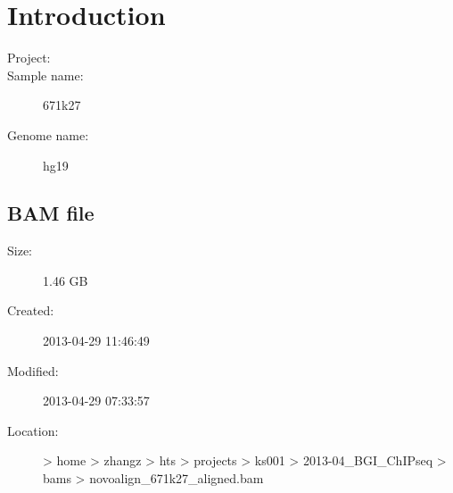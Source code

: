 \documentclass{article}
\begin{document}
\newpage
\section{Introduction}
\begin{description}
\item[\large{Project:}] 
\item[\large{Sample name:}] 671k27
\item[\large{Genome name:}] hg19
\end{description}

\subsection{BAM file}
\begin{description}
\item[\large{Size:}] 1.46 GB
\item[\large{Created:}] 2013-04-29 11:46:49
\item[\large{Modified:}] 2013-04-29 07:33:57
\item[\large{Location:}]  > home > zhangz > hts > projects > ks001 > 2013-04_BGI_ChIPseq > bams > novoalign_671k27_aligned.bam
\end{description}
\end{document}
